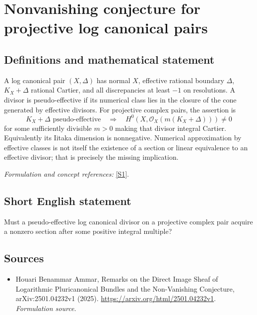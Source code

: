 \documentclass[11pt]{article}
\begin{document}
\section*{\texorpdfstring{Nonvanishing conjecture for projective log canonical pairs}{Nonvanishing conjecture for projective log canonical pairs}}\label{30006784}
\subsection{Definitions and mathematical statement}
A log canonical pair $(X,\Delta)$ has normal $X$, effective rational boundary $\Delta$, $K_X+\Delta$ rational Cartier, and all discrepancies at least $-1$ on resolutions. A divisor is pseudo-effective if its numerical class lies in the closure of the cone generated by effective divisors. For projective complex pairs, the assertion is
\[
 K_X+\Delta\text{ pseudo-effective}
 \quad\Longrightarrow\quad
 H^0(X,\mathcal O_X(m(K_X+\Delta)))\ne0
\]
for some sufficiently divisible $m>0$ making that divisor integral Cartier. Equivalently its Iitaka dimension is nonnegative. Numerical approximation by effective classes is not itself the existence of a section or linear equivalence to an effective divisor; that is precisely the missing implication.
\par\smallskip\textit{Formulation and concept references:} \href{https://arxiv.org/html/2501.04232v1}{[S1]}.

\subsection{Short English statement}
Must a pseudo-effective log canonical divisor on a projective complex pair acquire a nonzero section after some positive integral multiple?
\subsection{Sources}
\begin{itemize}
\item[S1]Houari Benammar Ammar, Remarks on the Direct Image Sheaf of Logarithmic Pluricanonical Bundles and the Non-Vanishing Conjecture, arXiv:2501.04232v1 (2025).
\url{https://arxiv.org/html/2501.04232v1}.
\textit{Formulation source.}
\end{itemize}
\end{document}
